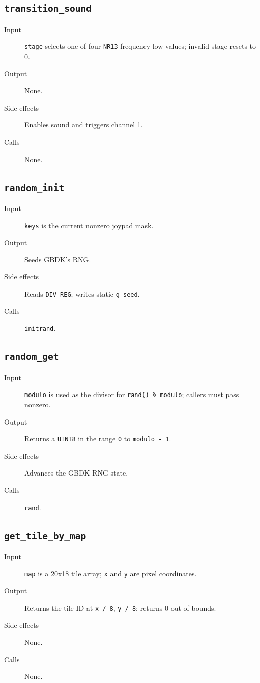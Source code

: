 \subsection*{\texttt{transition\_sound}}
\begin{description}
  \item[Input] \texttt{stage} selects one of four \texttt{NR13} frequency low values; invalid stage resets to 0.
  \item[Output] None.
  \item[Side effects] Enables sound and triggers channel 1.
  \item[Calls] None.
\end{description}

\subsection*{\texttt{random\_init}}
\begin{description}
  \item[Input] \texttt{keys} is the current nonzero joypad mask.
  \item[Output] Seeds GBDK's RNG.
  \item[Side effects] Reads \texttt{DIV\_REG}; writes static \texttt{g\_seed}.
  \item[Calls] \texttt{initrand}.
\end{description}

\subsection*{\texttt{random\_get}}
\begin{description}
  \item[Input] \texttt{modulo} is used as the divisor for \texttt{rand() \% modulo}; callers must pass nonzero.
  \item[Output] Returns a \texttt{UINT8} in the range \texttt{0} to \texttt{modulo - 1}.
  \item[Side effects] Advances the GBDK RNG state.
  \item[Calls] \texttt{rand}.
\end{description}

\subsection*{\texttt{get\_tile\_by\_map}}
\begin{description}
  \item[Input] \texttt{map} is a 20x18 tile array; \texttt{x} and \texttt{y} are pixel coordinates.
  \item[Output] Returns the tile ID at \texttt{x / 8}, \texttt{y / 8}; returns 0 out of bounds.
  \item[Side effects] None.
  \item[Calls] None.
\end{description}

